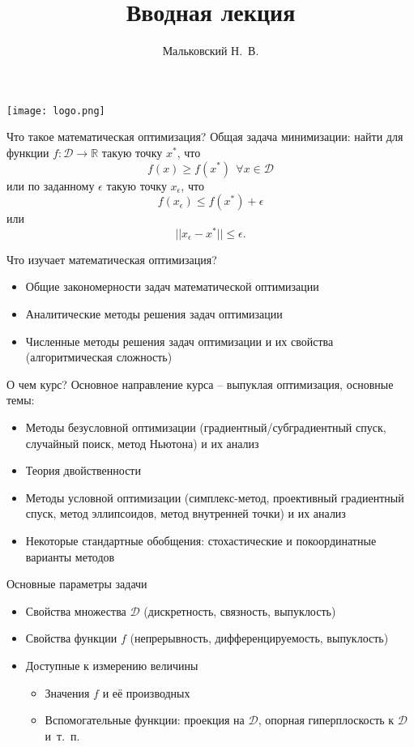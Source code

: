 \documentclass[10pt]{beamer}
\author{Мальковский Н.~В.}
\title[Вводная лекция]{Вводная лекция}
\institute[СПбАУ]{Санкт-Петербургский Академический  Университет}
\date{}
\begin{document}
\begin{frame}
\titlepage
\centering
\texttt{[image: logo.png]}
\end{frame}

\begin{frame}{Что такое математическая оптимизация?}
\pause
Общая задача минимизации: найти для функции $f:\mathcal{D}\rightarrow\mathbb{R}$ такую точку $x^*$, что
$$
f(x)\geq f(x^*)~~\forall x\in \mathcal{D}
$$
\pause
или по заданному $\epsilon$ такую точку $x_\epsilon$, что
$$
f(x_\epsilon)\leq f(x^*)+\epsilon
$$
или
$$
||x_\epsilon-x^*||\leq \epsilon.
$$

\end{frame}

\begin{frame}{Что изучает математическая оптимизация?}
\pause
\begin{itemize}[<+->]
\item Общие закономерности задач математической оптимизации
\item Аналитические методы решения задач оптимизации
\item Численные методы решения задач оптимизации и их свойства (алгоритмическая сложность)
\end{itemize}
\end{frame}

\begin{frame}{О чем курс?}
Основное направление курса -- выпуклая оптимизация, основные темы:
\pause
\begin{itemize}[<+->]
\item Методы безусловной оптимизации (градиентный/субградиентный спуск, случайный поиск, метод Ньютона) и их анализ
\item Теория двойственности
\item Методы условной оптимизации (симплекс-метод, проективный градиентный спуск, метод эллипсоидов, метод внутренней точки) и их анализ
\item Некоторые стандартные обобщения: стохастические и покоординатные варианты методов 
\end{itemize}
\end{frame}

\begin{frame}{Основные параметры задачи}
\pause
\begin{itemize}[<+->]
\item Свойства множества $\mathcal{D}$ (дискретность, связность, выпуклость)
\item Свойства функции $f$ (непрерывность, дифференцируемость, выпуклость)
\item Доступные к измерению величины
\begin{itemize}[<+->]
\item Значения $f$ и её производных
\item Вспомогательные функции: проекция на $\mathcal{D}$, опорная гиперплоскость к $\mathcal{D}$ и~т.~п.
\end{itemize}
\end{itemize}
\end{frame}
\end{document}
